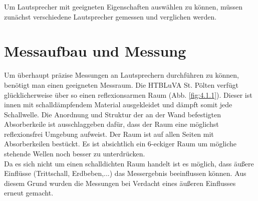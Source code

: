 
Um Lautsprecher mit geeigneten Eigenschaften auswählen zu können, müssen zunächst verschiedene Lautsprecher gemessen und verglichen werden.

\section{Messaufbau und Messung}\label{sec:4.1}
Um überhaupt präzise Messungen an Lautsprechern durchführen zu können, benötigt man einen geeigneten Messraum.
Die HTBLuVA St. Pölten verfügt glücklicherweise über so einen reflexionsarmen Raum (Abb. \ref{fig:4.1.1}).
Dieser ist innen mit schalldämpfendem Material ausgekleidet und dämpft somit jede Schallwelle.
Die Anordnung und Struktur der an der Wand befestigten Absorberkeile ist ausschlaggeben dafür, dass der Raum eine möglichst reflexionsfrei Umgebung aufweist.
Der Raum ist auf allen Seiten mit Absorberkeilen bestückt.
Es ist absichtlich ein 6-eckiger Raum um mögliche stehende Wellen noch besser zu unterdrücken.\\
Da es sich nicht um einen schalldichten Raum handelt ist es möglich, dass äußere Einflüsse (Trittschall, Erdbeben,...) das Messergebnis beeinflussen können.
Aus diesem Grund wurden die Messungen bei Verdacht eines äußeren Einflusses erneut gemacht.


